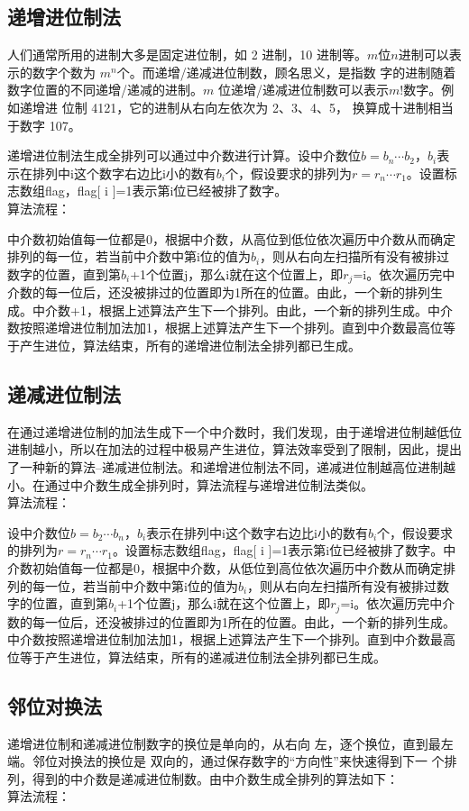 \documentclass[6pt, twocolumn]{ctexart}
\begin{document}
\subsection{递增进位制法}
人们通常所用的进制大多是固定进位制，如 2 进制，10 进制等。$m$位$n$进制可以表示的数字个数为 $m^n$个。而递增/递减进位制数，顾名思义，是指数 字的进制随着数字位置的不同递增/递减的进制。$m$ 位递增/递减进位制数可以表示$m!$数字。例如递增进 位制 4121，它的进制从右向左依次为 2、3、4、5， 换算成十进制相当于数字 107。

递增进位制法生成全排列可以通过中介数进行计算。设中介数位$b = b_n\cdots b_{2}$，$b_i$表示在排列中i这个数字右边比i小的数有$b_i$个，假设要求的排列为$r= r_n\cdots r_1$。设置标志数组flag，flag[ i ]=1表示第i位已经被排了数字。\\
算法流程：

中介数初始值每一位都是0，根据中介数，从高位到低位依次遍历中介数从而确定排列的每一位，若当前中介数中第i位的值为$b_i$，则从右向左扫描所有没有被排过数字的位置，直到第$b_i$+1个位置j，那么i就在这个位置上，即$r_j$=i。依次遍历完中介数的每一位后，还没被排过的位置即为1所在的位置。由此，一个新的排列生成。中介数+1，根据上述算法产生下一个排列。由此，一个新的排列生成。中介数按照递增进位制加法加1，根据上述算法产生下一个排列。直到中介数最高位等于产生进位，算法结束，所有的递增进位制法全排列都已生成。
\subsection{递减进位制法}
在通过递增进位制的加法生成下一个中介数时，我们发现，由于递增进位制越低位进制越小，所以在加法的过程中极易产生进位，算法效率受到了限制，因此，提出了一种新的算法--递减进位制法。和递增进位制法不同，递减进位制越高位进制越小。在通过中介数生成全排列时，算法流程与递增进位制法类似。\\
算法流程：

设中介数位$b = b_2\cdots b_{n}$，$b_i$表示在排列中i这个数字右边比i小的数有$b_i$个，假设要求的排列为$r= r_n\cdots r_1$。设置标志数组flag，flag[ i ]=1表示第i位已经被排了数字。中介数初始值每一位都是0，根据中介数，从低位到高位依次遍历中介数从而确定排列的每一位，若当前中介数中第i位的值为$b_i$，则从右向左扫描所有没有被排过数字的位置，直到第$b_i$+1个位置j，那么i就在这个位置上，即$r_j$=i。依次遍历完中介数的每一位后，还没被排过的位置即为1所在的位置。由此，一个新的排列生成。中介数按照递增进位制加法加1，根据上述算法产生下一个排列。直到中介数最高位等于产生进位，算法结束，所有的递减进位制法全排列都已生成。
\subsection{邻位对换法}
递增进位制和递减进位制数字的换位是单向的，从右向 左，逐个换位，直到最左端。邻位对换法的换位是 双向的，通过保存数字的“方向性”来快速得到下一 个排列，得到的中介数是递减进位制数。由中介数生成全排列的算法如下：\\
算法流程：
\end{document}
